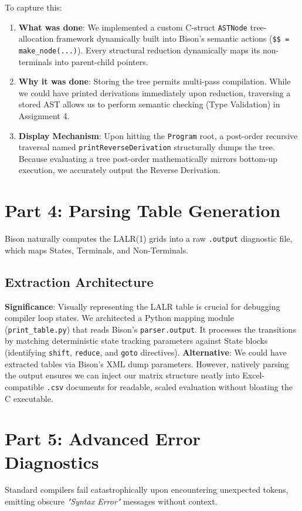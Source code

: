 \documentclass[12pt, a4paper]{article}
\begin{document}
To capture this:
\begin{enumerate}
    \item \textbf{What was done}: We implemented a custom C-struct \texttt{ASTNode} tree-allocation framework dynamically built into Bison's semantic actions (\texttt{\$\$ = make\_node(...)}). Every structural reduction dynamically maps its non-terminals into parent-child pointers.
    \item \textbf{Why it was done}: Storing the tree permits multi-pass compilation. While we could have printed derivations immediately upon reduction, traversing a stored AST allows us to perform semantic checking (Type Validation) in Assignment 4.
    \item \textbf{Display Mechanism}: Upon hitting the \texttt{Program} root, a post-order recursive traversal named \texttt{printReverseDerivation} structurally dumps the tree. Because evaluating a tree post-order mathematically mirrors bottom-up execution, we accurately output the Reverse Derivation.
\end{enumerate}

\section{Part 4: Parsing Table Generation}
Bison naturally computes the LALR(1) grids into a raw \texttt{.output} diagnostic file, which maps States, Terminals, and Non-Terminals.
\subsection{Extraction Architecture}
\textbf{Significance}: Visually representing the LALR table is crucial for debugging compiler loop states. We architected a Python mapping module (\texttt{print\_table.py}) that reads Bison's \texttt{parser.output}. It processes the transitions by matching deterministic state tracking parameters against State blocks (identifying \texttt{shift}, \texttt{reduce}, and \texttt{goto} directives).
\newline
\textbf{Alternative}: We could have extracted tables via Bison's XML dump parameters. However, natively parsing the output ensures we can inject our matrix structure neatly into Excel-compatible \texttt{.csv} documents for readable, scaled evaluation without bloating the C executable.

\section{Part 5: Advanced Error Diagnostics}
Standard compilers fail catastrophically upon encountering unexpected tokens, emitting obscure \textit{"Syntax Error"} messages without context.
\end{document}
